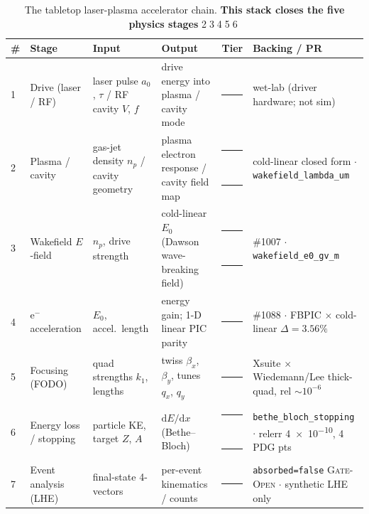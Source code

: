 \documentclass[11pt,a4paper]{article}
\newcommand{\tierdisc}[1]{\textcolor{#1}{\rule[0.05ex]{1.0ex}{1.0ex}}}
\newcommand{\tierBlue}{\tierdisc{blue!70!black}}
\newcommand{\tierGreen}{\tierdisc{green!60!black}}
\newcommand{\tierOrange}{\tierdisc{orange!90!black}}
\begin{document}
\medskip
\begin{table}[h]
\centering
\scriptsize
\setlength{\tabcolsep}{4pt}
\begin{tabular}{@{}>{\centering\arraybackslash}m{0.3cm} >{\raggedright\arraybackslash}m{2.05cm} >{\raggedright\arraybackslash}m{2.55cm} >{\raggedright\arraybackslash}m{2.7cm} >{\centering\arraybackslash}m{0.55cm} >{\raggedright\arraybackslash}m{4.0cm}@{}}
\toprule
\textbf{\#} & \textbf{Stage} & \textbf{Input} & \textbf{Output} & \textbf{Tier} & \textbf{Backing / PR} \\
\midrule
\textcircled{\scriptsize 1} & Drive (laser / RF)         & laser pulse $a_0$, $\tau$ / RF cavity $V$, $f$ & drive energy into plasma / cavity mode & \tierOrange & wet-lab (driver hardware; not sim) \\
\textcircled{\scriptsize 2} & Plasma / cavity            & gas-jet density $n_p$ / cavity geometry & plasma electron response / cavity field map & \tierGreen\,\tierBlue & cold-linear closed form $\cdot$ \texttt{wakefield\_lambda\_um} \\
\textcircled{\scriptsize 3} & Wakefield $E$-field        & $n_p$, drive strength & cold-linear $E_0$ (Dawson wave-breaking field) & \tierGreen\,\tierBlue & \#1007 $\cdot$ \texttt{wakefield\_e0\_gv\_m} \\
\textcircled{\scriptsize 4} & $\mathrm{e^-}$ acceleration & $E_0$, accel.\ length & energy gain; 1-D linear PIC parity & \tierGreen & \#1088 $\cdot$ FBPIC $\times$ cold-linear $\Delta\!=\!3.56\%$ \\
\textcircled{\scriptsize 5} & Focusing (FODO)            & quad strengths $k_1$, lengths & twiss $\beta_x$, $\beta_y$, tunes $q_x$, $q_y$ & \tierGreen & Xsuite $\times$ Wiedemann/Lee thick-quad, rel $\sim\!10^{-6}$ \\
\textcircled{\scriptsize 6} & Energy loss / stopping     & particle KE, target $Z$, $A$ & $\mathrm{d}E/\mathrm{d}x$ (Bethe--Bloch) & \tierGreen\,\tierBlue & \texttt{bethe\_bloch\_stopping} $\cdot$ relerr \SI{4e-10}{}, 4 PDG pts \\
\textcircled{\scriptsize 7} & Event analysis (LHE)       & final-state 4-vectors & per-event kinematics / counts & \tierOrange & \texttt{absorbed=false} \textsc{Gate-Open} $\cdot$ synthetic LHE only \\
\bottomrule
\end{tabular}
\caption{The tabletop laser-plasma accelerator chain.
\textbf{This stack closes the five physics stages}
\textcircled{\scriptsize 2}\textcircled{\scriptsize 3}\textcircled{\scriptsize 4}\textcircled{\scriptsize 5}\textcircled{\scriptsize 6}
}
\end{table}
\end{document}
